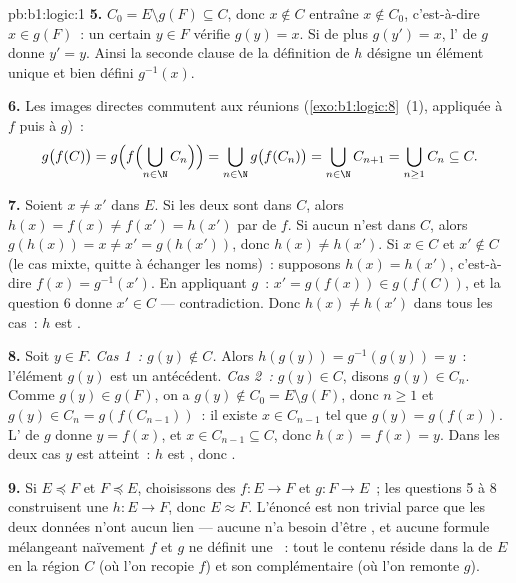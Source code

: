 \begin{solution}{pb:b1:logic:1}
\textbf{5.} $C_0 = E \setminus g(F) \subseteq C$, donc $x \notin C$
entraîne $x \notin C_0$, c'est-à-dire $x \in g(F)$~: un certain $y \in
F$ vérifie $g(y) = x$. Si de plus $g(y') = x$, l' de $g$
donne $y' = y$. Ainsi la seconde clause de la définition de $h$ désigne
un élément unique et bien défini $g^{-1}(x)$.

\textbf{6.} Les images directes commutent aux réunions
(\cref{exo:b1:logic:8}~(1), appliquée à $f$ puis à $g$)~:
\[
g\bigl(f(C)\bigr)
= g\Bigl(f\Bigl(\bigcup_{n \in \N} C_n\Bigr)\Bigr)
= \bigcup_{n \in \N} g\bigl(f(C_n)\bigr)
= \bigcup_{n \in \N} C_{n+1}
= \bigcup_{n \geq 1} C_n \subseteq C .
\]

\textbf{7.} Soient $x \neq x'$ dans $E$. Si les deux sont dans $C$,
alors $h(x) = f(x) \neq f(x') = h(x')$ par  de $f$. Si aucun
n'est dans $C$, alors $g(h(x)) = x \neq x' = g(h(x'))$, donc $h(x) \neq
h(x')$. Si $x \in C$ et $x' \notin C$ (le cas mixte, quitte à échanger
les noms)~: supposons $h(x) = h(x')$, c'est-à-dire $f(x) = g^{-1}(x')$.
En appliquant $g$~: $x' = g(f(x)) \in g(f(C))$, et la question 6 donne
$x' \in C$ --- contradiction. Donc $h(x) \neq h(x')$ dans tous les
cas~: $h$ est .

\textbf{8.} Soit $y \in F$. \emph{Cas 1~: $g(y) \notin C$.} Alors
$h(g(y)) = g^{-1}(g(y)) = y$~: l'élément $g(y)$ est un antécédent.
\emph{Cas 2~: $g(y) \in C$}, disons $g(y) \in C_n$. Comme $g(y) \in
g(F)$, on a $g(y) \notin C_0 = E \setminus g(F)$, donc $n \geq 1$
et $g(y) \in C_n = g(f(C_{n-1}))$~: il existe $x \in C_{n-1}$ tel que
$g(y) = g(f(x))$. L' de $g$ donne $y = f(x)$, et $x \in
C_{n-1} \subseteq C$, donc $h(x) = f(x) = y$. Dans les deux cas $y$ est
atteint~: $h$ est , donc .

\textbf{9.} Si $E \preceq F$ et $F \preceq E$, choisissons des
 $f \colon E \to F$ et $g \colon F \to E$~; les questions
5 à 8 construisent une  $h \colon E \to F$, donc $E \approx
F$. L'énoncé est non trivial parce que les deux  données
n'ont aucun lien --- aucune n'a besoin d'être , et aucune
formule mélangeant naïvement $f$ et $g$ ne définit une ~:
tout le contenu réside dans la  de $E$ en la région $C$ (où
l'on recopie $f$) et son complémentaire (où l'on remonte $g$).


\end{solution}
